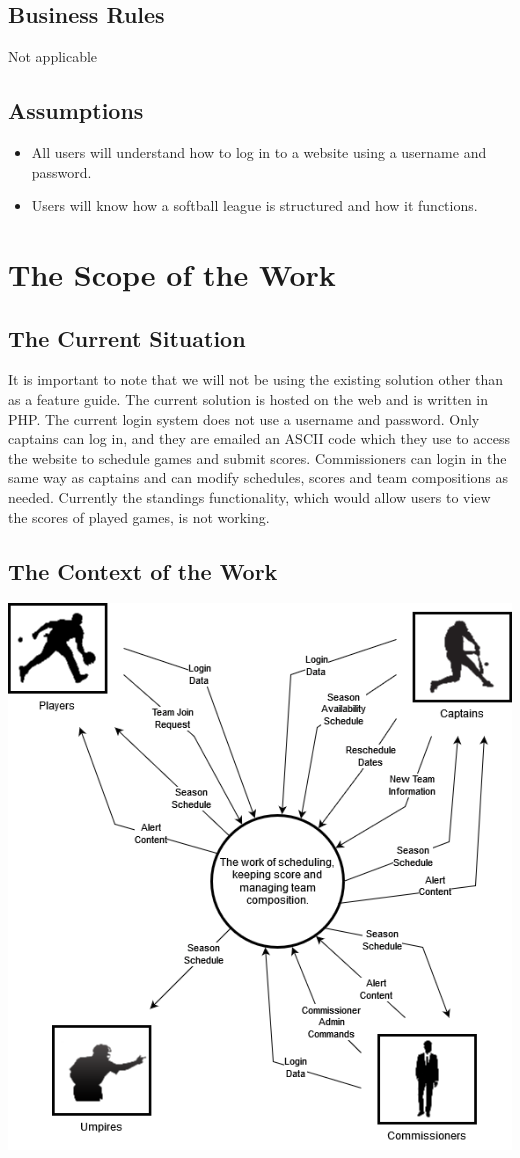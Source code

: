 \documentclass[12pt]{article}
\begin{document}
\subsection{Business Rules}
Not applicable

\subsection{Assumptions}
\begin{itemize}
  \item All users will understand how to log in to a website using a username
  and password.
  \item Users will know how a softball league is structured and how it functions.
\end{itemize}

\section{The Scope of the Work}
\subsection{The Current Situation}
It is important to note that we will not be using the existing solution other
than as a feature guide. The current solution is hosted on the web and is
written in PHP. The current login system does not use a username and password.
Only captains can log in, and they are emailed an ASCII code which they use to
access the website to schedule games and submit scores. Commissioners can login
in the same way as captains and can modify schedules, scores and team
compositions as needed. Currently the standings functionality, which would
allow users to view the scores of played games, is not working.
\subsection{The Context of the Work}
\includegraphics[scale=0.6]{6b_context_diagram.png}
\end{document}
